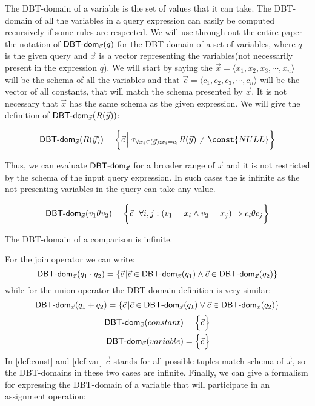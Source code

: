 \documentclass[12pt]{article}
\begin{document}
The DBT-domain of a variable is the set of values that it can take. The DBT-domain of all the variables in a query expression can easily be computed recursively if some rules are respected. We will use through out the entire paper the notation of $\text{\textsf{DBT-dom}{}}_{\vec x}(q)$ for the DBT-domain of a set of variables, where $q$ is the given query and $\vec x$ is a vector representing the variables(not necessarily present in the expression $q$). We will start by saying the $\vec x=\langle x_1,x_2,x_3,\cdots,x_n\rangle$ will be the schema of all the variables 
and that $\vec c=\langle c_1,c_2,c_3,\cdots,c_n\rangle$ will be the vector of all constants, that will match the schema presented by $\vec x$. It is not necessary that $\vec{x}$  has the same schema as the given expression. We will give the definition of $\textsf{DBT-dom}{}_{\vec x}(R(\vec y))$:

\begin{equation}
\label{def:relation}
\dom{}_{\vec x}(R(\vec y))=\bigg\{\vec c\,\Big|\,\sigma_{\forall x_i\in(\vec{y}): x_{i}=c_{i}}R(\vec y)\not= \const{NULL}\bigg\}
\end{equation}

Thus, we can evaluate $\text{\textsf{DBT-dom}}_{\vec{x}}$ for a broader range of $\vec{x}$ and it is not restricted by the schema of the input query expression. In such cases the \dom{} is infinite as the not presenting variables in the query can take any value.

\begin{equation}
\text{\textsf{DBT-dom}{}}_{\vec{x}}(v_{1}\theta v_{2})=\bigg\{\vec{c}\,\Big|\,\forall i,j:(v_{1}=x_{i}\land v_{2}=x_{j})\Rightarrow c_{i}\theta c_{j}\bigg\}
\end{equation}

The DBT-domain of a comparison is infinite.

For the join operator we can write:
\begin{equation}
\label{def:join}
\text{\textsf{DBT-dom}{}}_{\vec{x}}(q_{1}\cdot q_{2})=\{\vec{c}\,|\vec{c}\in\text{\textsf{DBT-dom}{}}_{\vec{x}}(q_{1})\land\vec{c}\in\text{\textsf{DBT-dom}{}}_{\vec{x}}(q_{2})\}
\end{equation}
while for the union operator the DBT-domain definition is very similar:
\begin{equation}
\label{def:plus}
\text{\textsf{DBT-dom}{}}_{\vec{x}}(q_{1}+ q_{2})=\{\vec{c}\,|\vec{c}\in\text{\textsf{DBT-dom}{}}_{\vec{x}}(q_{1})\lor\vec{c}\in\text{\textsf{DBT-dom}{}}_{\vec{x}}(q_{2})\}
\end{equation}
\begin{eqnarray}
\textsf{DBT-dom}{}_{\vec x}(constant)=\Big\{\vec c\Big\}\label{def:const}\\
\textsf{DBT-dom}{}_{\vec x}(variable)=\Big\{\vec c\Big\}\label{def:var}
\end{eqnarray}
In \eqref{def:const} and \eqref{def:var}  $\vec{c}$ stands for all possible tuples match schema of $\vec{x}$, so the DBT-domains in these two cases are infinite. 
Finally, we can give a formalism for expressing the DBT-domain of a variable that will participate in an assignment operation:
\end{document}
